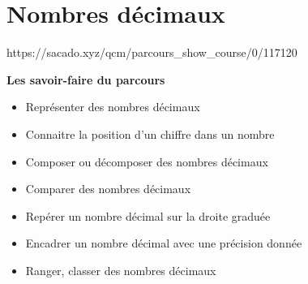 \chapter{Nombres décimaux}
{https://sacado.xyz/qcm/parcours_show_course/0/117120}
{ 

 \begin{CpsCol}
 \textbf{Les savoir-faire du parcours} 
 \begin{itemize}
 \item Représenter des nombres décimaux 
 \item Connaitre la position d'un chiffre dans un nombre
 \item Composer ou décomposer des nombres décimaux  
 \item Comparer des nombres décimaux  
 \item Repérer un nombre décimal sur la droite graduée
 \item Encadrer un nombre décimal avec une précision donnée
 \item Ranger, classer des nombres décimaux 
 \end{itemize}
 \end{CpsCol}
}
%
%
% 
%
% 
%




